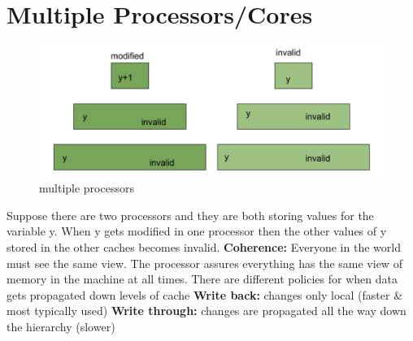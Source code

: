 \documentclass[twoside]{article}
\begin{document}
\section{Multiple Processors/Cores}
\begin{figure}[h!]
  \includegraphics[width=\linewidth]{fig5.png}
  \caption{multiple processors}
  \label{fig:fig5}
\end{figure}
Suppose there are two processors and they are both storing values for the variable y. When y gets modified in one processor then the other values of y stored in the other caches becomes invalid.
\newline
\textbf{Coherence:} Everyone in the world must see the same view. The processor assures everything has the same view of memory in the machine at all times.
\newline\newline
There are different policies for when data gets propagated down levels of cache
\newline
\textbf{Write back:} changes only local (faster & most typically used)
\newline
\textbf{Write through:} changes are propagated all the way down the hierarchy (slower)
\end{document}
